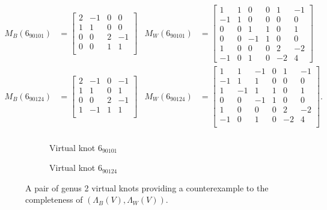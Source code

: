 \documentclass[12pt]{report}
\theoremstyle{upright}
\begin{document}
\begin{align*}M_{B}(6_{90101})
	&= \begin{bmatrix}
	2 & -1 & 0 & 0\\
	1 & 1 & 0 & 0\\
	0 & 0 & 2 & -1\\
	0 & 0 & 1 & 1\\
\end{bmatrix}& M_{W}(6_{90101}) &= \begin{bmatrix}
1  & 1 & 0  & 0 & 1   &-1\\
-1&  1  &0 &  0  &0   &0 \\
0&   0 & 1   &1&  0   &1 \\
0   &0  &-1 & 1 & 0   &0 \\
1  & 0&  0 &  0  &2  & -2\\
-1&  0 & 1&   0 & -2&  4 
\end{bmatrix}\\
M_{B}(6_{90124}) &= \begin{bmatrix}
	2 & -1 & 0 & -1\\
	1 & 1 & 0 & 1\\
	0 & 0 & 2 & -1\\
	1 & -1 & 1 & 1\\
\end{bmatrix}
& M_{W}(6_{90124})
&= \begin{bmatrix}
	1  & 1  & -1&  0  &1 &  -1\\	                     
	-1 & 1 &  1  & 0  &0  & 0 \\
	1  & -1  &1   &1  &0   &1 \\
	0  & 0  & -1&  1  &0   &0 \\
	1  & 0 &  0  & 0 & 2   &-2\\
	-1 & 0&   1   &0&  -2  &4 \\
\end{bmatrix}.
\\\end{align*}
\begin{figure}[H]
	\centering
	\hspace*{\fill}
	\begin{subfigure}[b]{0.4 \textwidth}
		\centering
		\def\svgscale{0.35}
		
		\caption{Virtual knot $6_{90101}$}
		\label{fig:6-90101_vknot}
	\end{subfigure}
	\hspace*{\fill}	\hspace*{\fill}	\hspace*{\fill}
	\begin{subfigure}[b]{0.4 \textwidth}
		\centering
		\def\svgscale{0.35}
		
		\caption{Virtual knot $6_{90124}$}
		\label{fig:6-90124_vknot}
	\end{subfigure}
	\hspace*{\fill} 
	\caption{A pair of genus 2 virtual knots providing a counterexample to the completeness of $(\Lambda_{B}(V), \Lambda_{W}(V))$.}
	\label{fig:counterexamples}
\end{figure}
\end{document}
